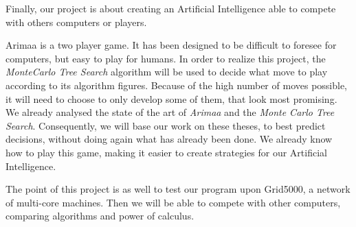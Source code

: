 
Finally, our project is about creating an Artificial Intelligence able to compete with others computers or players.
\newline

Arimaa is a two player game. It has been designed to be difficult to foresee for computers, but easy to play for humans. 
In order to realize this project, the \emph{MonteCarlo Tree Search} algorithm will be used to decide what move to play according to its algorithm figures. Because of the high number of moves possible, it will need to choose to only develop some of them, that look most promising.
We already analysed the state of the art of \emph{Arimaa} and the \emph{Monte Carlo Tree Search}. Consequently, we will base our work on these theses, to best predict decisions, without doing again what has already been done.
We already know how to play this game, making it easier to create strategies for our Artificial Intelligence. 
\newline

The point of this project is as well to test our program upon Grid5000, a network of multi-core machines. Then we will be able to compete with other computers, comparing algorithms and power of calculus.